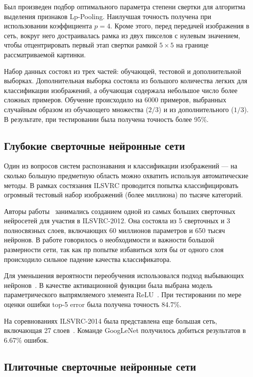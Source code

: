 \documentclass[a4paper,14pt]{extarticle} %
\begin{document}
Был произведен подбор оптимального параметра степени свертки для алгоритма выделения признаков Lp-Pooling. Наилучшая точность получена при использовании коэффициента $p=4$. Кроме этого, перед передачей изображения в сеть, вокруг него достраивалась рамка из двух пикселов с нулевым значением, чтобы отцентрировать первый этап свертки рамкой $5 \times 5$ на границе рассматриваемой картинки.

Набор данных состоял из трех частей: обучающей, тестовой и дополнительной выборках. Дополнительная выборка состояла из большого количества легких для классификации изображений, а обучающая содержала небольшое число более сложных примеров. Обучение происходило на 6000 примеров, выбранных случайным образом из обучающего множества ($2/3$) и из дополнительного ($1/3$). В результате, при тестировании была получена точность более 95\%.

\subsection{Глубокие сверточные нейронные сети}
\hspace{\parindent} Один из вопросов систем распознавания и классификации изображений --- на сколько большую предметную область можно охватить используя автоматические методы. В рамках состязания ILSVRC проводится попытка классифицировать огромный тестовый набор изображений (более миллиона) по тысяче категорий.

Авторы работы~\cite{krizhevsky2012imagenet} занимались созданием одной из самых больших сверточных нейросетей для участия в ILSVRC-2012. Она состояла из 5 сверточных и 3 полносвязных слоев, включающих 60 миллионов параметров и 650 тысяч нейронов. В работе говорилось о необходимости и важности большой размерности сети, так как пр попытке избавиться хотя бы от одного слоя происходило сильное падение качества классификатора. 

Для уменьшения вероятности переобучения использовался подход выбывающих нейронов~\cite{srivastava2014dropout}. В качестве активационной функции была выбрана модель параметрического выпрямляемого элемента ReLU~\cite{dahl2013improving}. При тестировании по мере оценки ошибки top-5 error была получена точность 84.7\%.

На соревнованиях ILSVRC-2014 была представлена еще большая сеть, включающая 27 слоев~\cite{szegedy2014going}. Команде GoogLeNet получилось добиться результатов в 6.67\% ошибок.

\subsection{Плиточные сверточные нейронные сети}
\hspace{\parindent}
\end{document}
